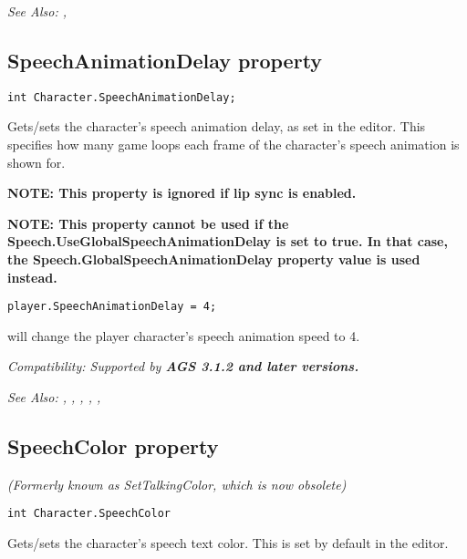 \it{See Also:} ,


\subsection{SpeechAnimationDelay property}\label{Character.SpeechAnimationDelay}%

\begin{verbatim}
int Character.SpeechAnimationDelay;
\end{verbatim}

Gets/sets the character's speech animation delay, as set in the editor. This specifies
how many game loops each frame of the character's speech animation is shown for.

\bf{NOTE:} This property is ignored if lip sync is enabled.

\bf{NOTE:} This property \bf{cannot} be used if the Speech.UseGlobalSpeechAnimationDelay is set to \bf{true}. In that case, the Speech.GlobalSpeechAnimationDelay property value is used instead.

\begin{verbatim}
player.SpeechAnimationDelay = 4;
\end{verbatim}
will change the player character's speech animation speed to 4.

\it{Compatibility:} Supported by \bf{AGS 3.1.2} and later versions.

\it{See Also:} ,
,
,
,
,


\subsection{SpeechColor property}\label{Character.SpeechColor}%

\it{(Formerly known as SetTalkingColor, which is now obsolete)}

\begin{verbatim}
int Character.SpeechColor
\end{verbatim}
Gets/sets the character's speech text color. This is set by default in the
editor.

